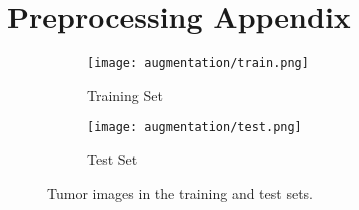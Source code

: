 \section{Preprocessing Appendix}\label{appendix:preprocessing}

\begin{figure}[H]
  \centering
  \begin{subfigure}[b]{0.3\textwidth}
    \centering
    \texttt{[image: augmentation/train.png]}
    \caption{Training Set}
    \label{fig:train_set}
  \end{subfigure}
  \begin{subfigure}[b]{0.3\textwidth}
    \centering
    \texttt{[image: augmentation/test.png]}
    \caption{Test Set}
    \label{fig:test_set}
  \end{subfigure}
  \caption{Tumor images in the training and test sets.}
  \label{fig:train_test_sets}
\end{figure}
